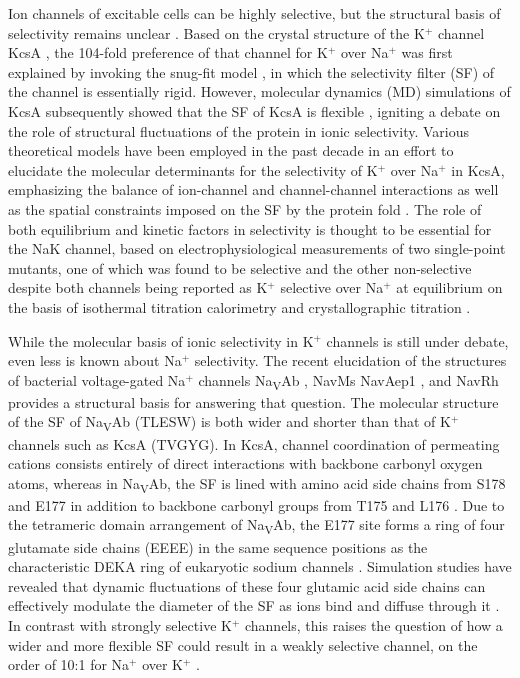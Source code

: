 \begin{refsection}
Ion channels of excitable cells can be highly selective, but the structural basis of selectivity remains unclear \cite{Hille:2001tw}.   Based on the crystal structure of the K$^+$ channel KcsA \cite{Doyle:1998wq}, the 104-fold  preference of that channel for K$^+$ over Na$^+$ was first explained by invoking the snug-fit model \cite{Bezanilla:1972uz}, in which the selectivity filter (SF) of the channel is essentially rigid.  However, molecular dynamics (MD) simulations of KcsA \cite{Guidoni:1999ba} subsequently showed that the SF of KcsA is flexible \cite{Andersen:2011ty}, igniting a debate on the role of structural fluctuations of the protein in ionic selectivity.  Various theoretical models have been employed in the past decade in an effort to elucidate the molecular determinants for the selectivity of K$^+$ over Na$^+$ in KcsA, emphasizing the balance of ion-channel and channel-channel interactions \cite{Noskov:2004tv} as well as the spatial constraints imposed on the SF by the protein fold \cite{Andersen:2011ty,Bostick:2010bm,Dixit:2011wf,Roux:2011ed,Varma:2011gn}. The role of both equilibrium and kinetic factors in selectivity is thought to be essential for the NaK channel, based on electrophysiological measurements of two single-point mutants, one of which was found to be selective and the other non-selective despite both channels being reported as K$^+$ selective over Na$^+$ at equilibrium on the basis of isothermal titration calorimetry and crystallographic titration \cite{Liu:2013hf,Sauer:2013gk}. 

While the molecular basis of ionic selectivity in K$^+$ channels is still under debate, even less is known about Na$^+$ selectivity.  The recent elucidation of the structures of bacterial voltage-gated Na$^+$ channels Na\textsubscript{V}Ab \cite{Payandeh:2012ib,Payandeh:2013ex}, NavMs \cite{McCusker:2012di} NavAep1 \cite{Shaya:2014gg}, and NavRh \cite{Zhang:2013bz} provides a structural basis for answering that question. The molecular structure of the SF of Na\textsubscript{V}Ab (TLESW) is both wider and shorter than that of K$^+$ channels such as KcsA (TVGYG).  In KcsA, channel coordination of permeating cations consists entirely of direct interactions with backbone carbonyl oxygen atoms, whereas in Na\textsubscript{V}Ab, the SF is lined with amino acid side chains from S178 and E177 in addition to backbone carbonyl groups from T175 and L176 \cite{Doyle:1998wq,Payandeh:2012ib,Jiang:2003vh}.  Due to the tetrameric domain arrangement of Na\textsubscript{V}Ab, the E177 site forms a ring of four glutamate side chains (EEEE) in the same sequence positions as the characteristic DEKA ring of eukaryotic sodium channels \cite{Heinemann:1992ep,Terlau:1991ud}. Simulation studies have revealed that dynamic fluctuations of these four glutamic acid side chains can effectively modulate the diameter of the SF as ions bind and diffuse through it \cite{Boiteux:2014ut,Chakrabarti:2013kd}. In contrast with strongly selective K$^+$ channels, this raises the question of how a wider and more flexible SF could result in a weakly selective channel, on the order of 10:1 for Na$^+$ over K$^+$ \cite{Payandeh:2012ex,Ulmschneider:2013da}. 


\end{refsection}
